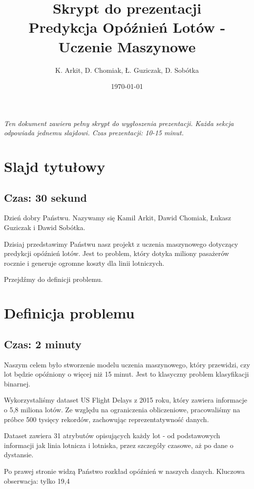 \documentclass[12pt,a4paper]{article}
\title{\huge\textbf{Skrypt do prezentacji}\\[0.5cm]
\Large Predykcja Opóźnień Lotów - Uczenie Maszynowe}
\author{K. Arkit, D. Chomiak, Ł. Guziczak, D. Sobótka}
\date{\today}
\begin{document}
\maketitle
\vspace{1cm}

\textit{Ten dokument zawiera pełny skrypt do wygłoszenia prezentacji. Każda sekcja odpowiada jednemu slajdowi. Czas prezentacji: 10-15 minut.}

\newpage

\section{Slajd tytułowy}
\subsection{Czas: 30 sekund}

Dzień dobry Państwu. Nazywamy się Kamil Arkit, Dawid Chomiak, Łukasz Guziczak i Dawid Sobótka. 

Dzisiaj przedstawimy Państwu nasz projekt z uczenia maszynowego dotyczący predykcji opóźnień lotów. Jest to problem, który dotyka miliony pasażerów rocznie i generuje ogromne koszty dla linii lotniczych.

Przejdźmy do definicji problemu.

\section{Definicja problemu}
\subsection{Czas: 2 minuty}

Naszym celem było stworzenie modelu uczenia maszynowego, który przewidzi, czy lot będzie opóźniony o więcej niż 15 minut. Jest to klasyczny problem klasyfikacji binarnej.

Wykorzystaliśmy dataset US Flight Delays z 2015 roku, który zawiera informacje o 5,8 miliona lotów. Ze względu na ograniczenia obliczeniowe, pracowaliśmy na próbce 500 tysięcy rekordów, zachowując reprezentatywność danych.

Dataset zawiera 31 atrybutów opisujących każdy lot - od podstawowych informacji jak linia lotnicza i lotniska, przez szczegóły czasowe, aż po dane o dystansie.

Po prawej stronie widzą Państwo rozkład opóźnień w naszych danych. Kluczowa obserwacja: tylko 19,4%
\end{document}
